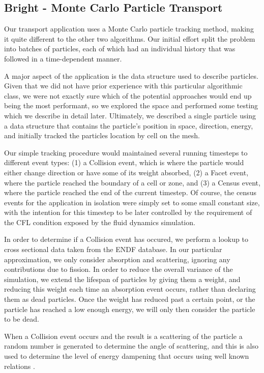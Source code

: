 \documentclass[runningheads,a4paper]{llncs}
\begin{document}
\subsection{Bright - Monte Carlo Particle Transport}

Our transport application uses a Monte Carlo particle tracking method, making it quite different to the other two algorithms. Our initial effort split the problem into batches of particles, each of which had an individual history that was followed in a time-dependent manner. 

A major aspect of the application is the data structure used to describe particles. Given that we did not have prior experience with this particular algorithmic class, we were not exactly sure which of the potential approaches would end up being the most performant, so we explored the space and performed some testing which we describe in detail later. Ultimately, we described a single particle using a data structure that contains the particle's position in space, direction, energy, and initially tracked the particles location by cell on the mesh.

Our simple tracking procedure would maintained several running timesteps to different event types: (1) a Collision event, which is where the particle would either change direction or have some of its weight absorbed, (2) a Facet event, where the particle reached the boundary of a cell or zone, and (3) a Census event, where the particle reached the end of the current timestep. Of course, the census events for the application in isolation were simply set to some small constant size, with the intention for this timestep to be later controlled by the requirement of the CFL condition exposed by the fluid dynamics simulation.

In order to determine if a Collision event has occured, we perform a lookup to cross sectional data taken from the ENDF database. In our particular approximation, we only consider absorption and scattering, ignoring any contributions due to fission. In order to reduce the overall variance of the simulation, we extend the lifespan of particles by giving them a weight, and reducing this weight each time an absorption event occurs, rather than declaring them as dead particles. Once the weight has reduced past a certain point, or the particle has reached a low enough energy, we will only then consider the particle to be dead.

When a Collision event occurs and the result is a scattering of the particle a random number is generated to determine the angle of scattering, and this is also used to determine the level of energy dampening that occurs using well known relations \cite{}.
\end{document}
